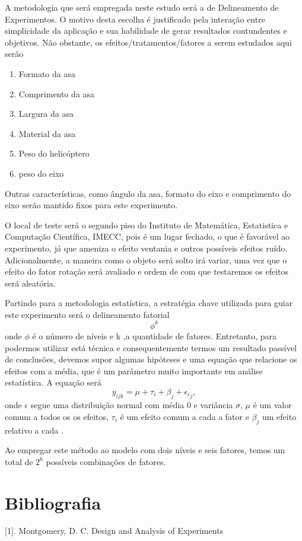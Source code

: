 \documentclass[10pt]{article}
\begin{document}
A metodologia que será empregada neste estudo será a de Delineamento de Experimentos.  O motivo desta escolha é justificado pela interação entre simplicidade da aplicação e sua habilidade de gerar  resultados contundentes e objetivos. Não obstante, os efeitos/tratamentos/fatores a serem estudados aqui serão

\begin{enumerate}
\item Formato da asa
\item  Comprimento da asa
\item Largura da asa
\item Material da asa
\item Peso do helicóptero
\item peso do eixo
\end{enumerate}

Outras características, como ângulo da asa, formato do eixo e comprimento do eixo serão mantido fixos para este experimento.

O local de teste será o segundo piso do Instituto de Matemática, Estatistica e Computação Científica, IMECC, pois é um lugar fechado, o que é favorável ao experimento, já que ameniza o efeito ventania e outros possíveis efeitos ruído. Adicionalmente, a maneira como o objeto será solto irá variar, uma vez que o efeito do fator rotação será avaliado e ordem de com que testaremos os efeitos será aleatória.

Partindo para a metodologia estatística, a estratégia chave utilizada para guiar este experimento será o delineamento fatorial $$\phi^k$$ onde $\phi$ é o número de níveis e k ,a quantidade de fatores. Entretanto, para podermos utilizar está técnica e consequentemente termos um resultado passível de conclusões, devemos supor algumas hipóteses e uma equação que relacione os efeitos com a média, que é um parâmetro muito importante em análise estatística. A equação será $$y_{ijk}= \mu + \tau_i + \beta_j + {\epsilon_i}_j,$$  onde  $\epsilon$ segue uma distribuição normal com média 0 e variância $\sigma$, $\mu$ é um valor comum a todos os os efeitos, $\tau_i$ é um efeito comum a cada a fator e $\beta_j$ um efeito relativo a cada .

Ao empregar este método ao modelo com dois níveis e seis fatores, temos um total de $2^{6}$ possíveis combinações de fatores.


\section{Bibliografia}

[1]. Montgomery, D. C. Design and Analysis of Experiments
\end{document}
